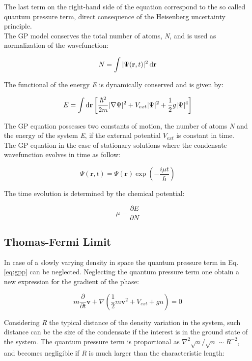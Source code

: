 \documentclass[../main.tex]{subfiles}
\begin{document}
The last term on the right-hand side of the equation correspond to the so called quantum pressure term, direct consequence of the Heisenberg uncertainty principle.\\
The GP model conserves the total number of atoms, \textit{N}, and is used as normalization of the wavefunction:

\begin{equation}
N = \int |\Psi(\textbf{r}, t)|^2 \mathop{}\!\mathrm{d}{\textbf{r}}
\end{equation}

The functional of the energy \textit{E} is dynamically conserved and is given by:

\begin{equation}
E = \int \mathop{}\!\mathrm{d}{\textbf{r}} \left[ \frac{\hbar^2}{2m} |\nabla \Psi|^2 + V_{ext} |\Psi|^2 + \frac{1}{2} g |\Psi|^4 \right]
\end{equation}

The GP equation possesses two constants of motion, the number of atoms \textit{N} and the energy of the system \textit{E}, if the external potential $V_{ext}$ is constant in time.\\
The GP equation in the case of stationary solutions where the condensate wavefunction evolves in time as follow:

\begin{equation}
\Psi(\textbf{r}, t) = \Psi(\textbf{r}) \exp(-\frac{i\mu t}{\hbar})
\end{equation}
 
The time evolution is determined by the chemical potential:

\begin{equation}
\mu = \frac{\partial E}{\partial N}
\end{equation}

\subsection{Thomas-Fermi Limit}

In case of a slowly varying density in space the quantum pressure term in Eq.\ref{eq:gpp} can be neglected. Neglecting the quantum pressure term one obtain a new expression for the gradient of the phase:

\begin{equation}
m \frac{\partial}{\partial t} \textbf{v} + \nabla \left( \frac{1}{2}m\textbf{v}^2 + V_{ext} + gn \right) = 0
\end{equation}

Considering \textit{R} the typical distance of the density variation in the system, such distance can be the size of the condensate if the interest is in the ground state of the system. The quantum pressure term is proportional as $\nabla^2 \sqrt{n} / \sqrt{n} \sim R^{-2}$, and becomes negligible if \textit{R} is much larger than the characteristic length:
\end{document}
